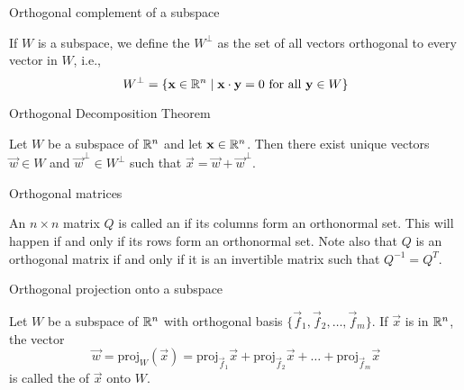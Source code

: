 \documentclass{ximera}
\begin{document}

Orthogonal complement of a subspace
\begin{expandable}
    If $W$ is a subspace, we define the  $W^\perp$ as the set of all vectors orthogonal to every vector in $W$, i.e.,
\begin{equation*}
W^\perp = \{\mathbf{x} \in\mathbb{R}^n \mid \mathbf{x} \cdot \mathbf{y} = 0 \mbox{ for all } \mathbf{y} \in W\}
\end{equation*}
\end{expandable}


Orthogonal Decomposition Theorem 
\begin{expandable}
    Let $W$ be a subspace of $\mathbb{R}^n$ and let $\mathbf{x} \in \mathbb{R}^n$.  Then there exist unique vectors $\vec{w} \in W$ and $\vec{w}^\perp \in W^\perp$ such that $\vec{x} = \vec{w} + \vec{w}^\perp$.
\end{expandable}


Orthogonal matrices
\begin{expandable}
    An $n \times n$ matrix $Q$ is called an  if its columns form an orthonormal set.  This will happen if and only if its rows form an orthonormal set.  Note also that $Q$ is an orthogonal matrix if and only if it is an invertible matrix such that $Q^{-1}=Q^{T}$.
\end{expandable}


Orthogonal projection onto a subspace
\begin{expandable}
    Let $W$ be a subspace of $\mathbb{R}^n$ with orthogonal basis $\{\vec{f}_{1}, \vec{f}_{2}, \dots, \vec{f}_{m}\}$. If $\vec{x}$ is in $\mathbb{R}^n$, the vector
\begin{equation}
\vec{w}=\mbox{proj}_W(\vec{x}) = \mbox{proj}_{\vec{f}_1}\vec{x} + \mbox{proj}_{\vec{f}_2}\vec{x} + \dots + \mbox{proj}_{\vec{f}_m}\vec{x}
\end{equation}
is called the  of $\vec{x}$ onto $W$. 
\end{expandable}
\end{document}

